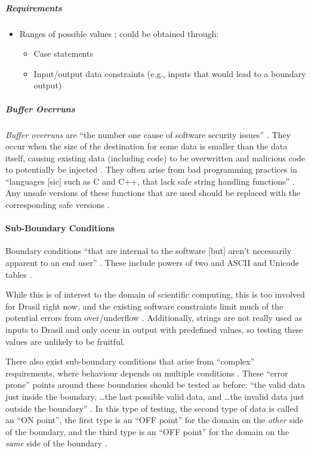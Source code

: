 \subparagraph{Requirements}
\begin{itemize}
      \item Ranges of possible values \citep[p.~67, 73]{Patton2006};
            could be obtained through:
            \begin{itemize}
                  \item Case statements
                  \item Input/output data constraints (e.g., inputs that
                        would lead to a boundary output)
            \end{itemize}
\end{itemize}

\subparagraph{Buffer Overruns \citep[pp.~201-205]{Patton2006}}

\emph{Buffer overruns} are ``the number one cause of software security issues''
\citep[p.~75]{Patton2006}. They occur when the size of the destination
for some data is smaller than the data itself, causing existing data (including
code) to be overwritten and malicious code to potentially be injected
\citep[p.~202, 204-205]{Patton2006}. They often arise from bad
programming practices in ``languages [sic] such as C and C++, that lack safe
string handling functions'' \citep[p.~201]{Patton2006}. Any unsafe
versions of these functions that are used should be replaced with the
corresponding safe versions \citep[pp.~203-204]{Patton2006}.

\paragraph{Sub-Boundary Conditions \citep[pp.~75-77]{Patton2006}}
\label{sub-bound-conds}

Boundary conditions ``that are internal to the software [but] aren't necessarily
apparent to an end user'' \citep[p.~75]{Patton2006}. These include
powers of two \citep[pp.~75-76]{Patton2006} and ASCII and Unicode tables
\citep[pp.~76-77]{Patton2006}.

While this is of interest to the domain of scientific computing, this is too
involved for Drasil right now, and the existing software constraints limit much
of the potential errors from over/underflow \citep{june_11_meeting}. Additionally,
strings are not really used as inputs to Drasil and only occur in output with
predefined values, so testing these values are unlikely to be fruitful.

There also exist sub-boundary conditions that arise from ``complex''
requirements, where behaviour depends on multiple conditions
\citep[p.~430]{vanVliet2000}. These ``error prone'' points around
these boundaries should be tested \citep[p.~430]{vanVliet2000} as
before: ``the valid data just inside the boundary, \dots the last possible
valid data, and \dots the invalid data just outside the boundary''
\citep[p.~73]{Patton2006}. In this type of testing, the second type of
data is called an ``ON point'', the first type is an ``OFF point'' for the
domain on the \emph{other} side of the boundary, and the third type is an ``OFF
point'' for the domain on the \emph{same} side of the boundary
\citep[p.~430]{vanVliet2000}.


